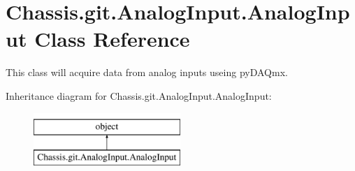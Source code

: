 \hypertarget{class_chassis_8git_1_1_analog_input_1_1_analog_input}{\section{Chassis.\-git.\-Analog\-Input.\-Analog\-Input Class Reference}
\label{class_chassis_8git_1_1_analog_input_1_1_analog_input}
}


This class will acquire data from analog inputs useing py\-D\-A\-Qmx.  


Inheritance diagram for Chassis.\-git.\-Analog\-Input.\-Analog\-Input\-:\begin{figure}[H]
\begin{center}
\leavevmode
\includegraphics[height=2.000000cm]{class_chassis_8git_1_1_analog_input_1_1_analog_input}
\end{center}
\end{figure}
